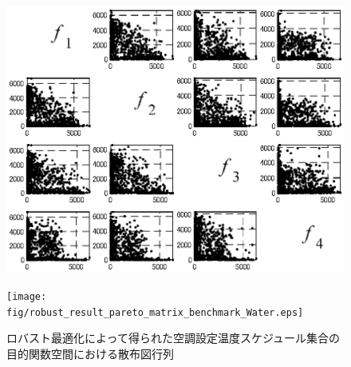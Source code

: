 \begin{figure}[htbp]
\begin{center}
\begin{minipage}{0.45\textwidth}
\begin{center}
                \includegraphics[width=1\textwidth,keepaspectratio=true]{fig/robust_result_pareto_matrix_benchmark_UF12.eps}\\\vspace{-5mm}{\small (g)UF12問題}
            \end{center}
        \end{minipage}
        \begin{minipage}{0.45\textwidth}
            \begin{center}
                \texttt{[image: fig/robust\_result\_pareto\_matrix\_benchmark\_Water.eps]}\\\vspace{-5mm}{\small (h)Water問題}
            \end{center}
        \end{minipage}

        \vspace{-1mm}
        \caption{ロバスト最適化によって得られた空調設定温度スケジュール集合の目的関数空間における散布図行列}
        \label{fig::robust_result_pareto_matrix}
    \end{center}
\end{figure}

